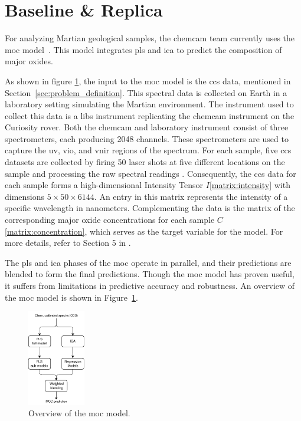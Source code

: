 \section{Baseline \& Replica}\label{sec:baseline_replica}
For analyzing Martian geological samples, the \gls{chemcam} team currently uses the \gls{moc} model~\cite{cleggRecalibrationMarsScience2017}.
This model integrates \gls{pls} and \gls{ica} to predict the composition of major oxides.

As shown in figure \ref{fig:moc_pipeline}, the input to the \gls{moc} model is the \gls{ccs} data, mentioned in Section~\ref{sec:problem_definition}.
This spectral data is collected on Earth in a laboratory setting simulating the Martian environment.
The instrument used to collect this data is a \gls{libs} instrument replicating the \gls{chemcam} instrument on the Curiosity rover.
Both the \gls{chemcam} and laboratory instrument consist of three spectrometers, each producing 2048 channels.
These spectrometers are used to capture the \gls{uv}, \gls{vio}, and \gls{vnir} regions of the spectrum.
For each sample, five \gls{ccs} datasets are collected by firing 50 laser shots at five different locations on the sample and processing the raw spectral readings \cite{wiensPreflightCalibrationInitial2013}.
Consequently, the \gls{ccs} data for each sample forms a high-dimensional Intensity Tensor $I$\ref{matrix:intensity} with dimensions $5 \times 50 \times 6144$.
An entry in this matrix represents the intensity of a specific wavelength in nanometers.
Complementing the data is the matrix of the corresponding major oxide concentrations for each sample $C$\ref{matrix:concentration}, which serves as the target variable for the model.
For more details, refer to Section 5 in \citet{p9_paper}.

The \gls{pls} and \gls{ica} phases of the \gls{moc} operate in parallel, and their predictions are blended to form the final predictions.
Though the \gls{moc} model has proven useful, it suffers from limitations in predictive accuracy and robustness.
An overview of the \gls{moc} model is shown in Figure~\ref{fig:moc_pipeline}.

\begin{figure}
	\centering
	\includegraphics[width=0.225\textwidth]{images/moc_pipeline.pdf}
	\caption{Overview of the \gls{moc} model.}
	\label{fig:moc_pipeline}
\end{figure}

